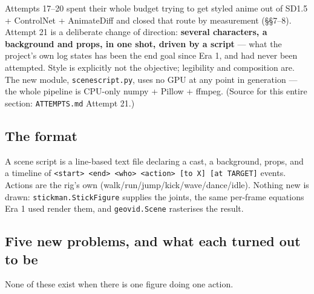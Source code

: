 \documentclass[11pt]{article}
\newcommand{\secsym}{\S}
\begin{document}
Attempts 17--20 spent their whole budget trying to get styled anime out
of SD1.5 + ControlNet + AnimateDiff and closed that route by measurement
(\secsym\secsym7--8). Attempt 21 is a deliberate change of direction:
\textbf{several characters, a background and props, in one shot, driven
by a script} --- what the project's own log states has been the end goal
since Era 1, and had never been attempted. Style is explicitly not the
objective; legibility and composition are. The new module,
\texttt{scenescript.py}, uses no GPU at any point in generation --- the
whole pipeline is CPU-only numpy + Pillow + ffmpeg. (Source for this
entire section: \texttt{ATTEMPTS.md} Attempt 21.)

\subsection{The format}
\label{sec:sceneformat}

A scene script is a line-based text file declaring a cast, a background,
props, and a timeline of \texttt{<start> <end> <who> <action> [to X] [at
TARGET]} events. Actions are the rig's own
(walk/run/jump/kick/wave/dance/idle). Nothing new is drawn:
\texttt{stickman.StickFigure} supplies the joints, the same per-frame
equations Era 1 used render them, and \texttt{geovid.Scene} rasterises the
result.

\subsection{Five new problems, and what each turned out to be}
\label{sec:fiveproblems}

None of these exist when there is one figure doing one action.
\end{document}
